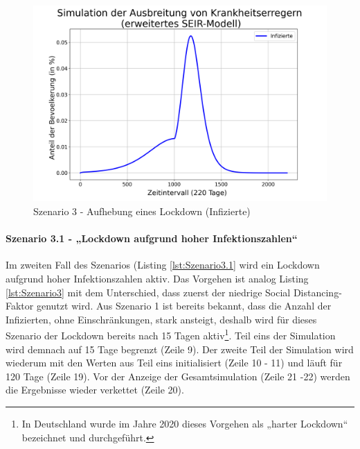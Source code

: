 \documentclass[12pt]{article}
\begin{document}
\begin{figure}[H]
\centering
\includegraphics[scale=0.4]{Szenario_3_Infizierte}
\caption{Szenario 3 - Aufhebung eines Lockdown (Infizierte)}
\label{fig:szenario_3_Infizierte}
\end{figure}

\paragraph{Szenario 3.1 - „Lockdown aufgrund hoher Infektionszahlen“}
Im zweiten Fall des Szenarios (Listing \ref{lst:Szenario3.1} wird ein Lockdown aufgrund hoher Infektionszahlen aktiv. Das Vorgehen ist analog Listing \ref{lst:Szenario3} mit dem Unterschied, dass zuerst der niedrige Social Distancing-Faktor genutzt wird. Aus Szenario 1 ist bereits bekannt, dass die Anzahl der Infizierten, ohne Einschränkungen, stark ansteigt, deshalb wird für dieses Szenario der Lockdown bereits nach 15 Tagen aktiv\footnote{In Deutschland wurde im Jahre 2020 dieses Vorgehen als „harter Lockdown“ bezeichnet und durchgeführt.}. Teil eins der Simulation wird demnach auf 15 Tage begrenzt (Zeile 9). Der zweite Teil der Simulation wird wiederum mit den Werten aus Teil eins initialisiert (Zeile 10 - 11) und läuft für 120 Tage (Zeile 19). Vor der Anzeige der Gesamtsimulation (Zeile 21 -22) werden die Ergebnisse wieder verkettet (Zeile 20).
\end{document}
